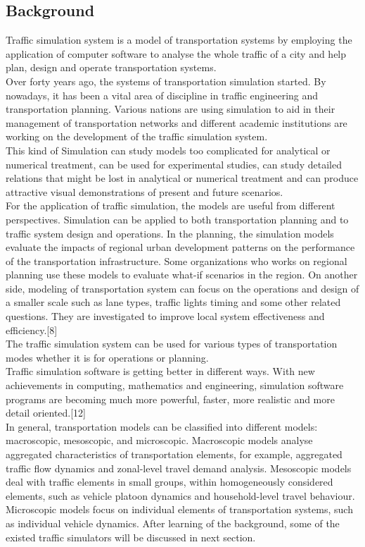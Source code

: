 \documentclass[a4paper,12pt]{article}
\begin{document}
\subsection{Background}
Traffic simulation system is a model of transportation systems by employing the application of computer software to analyse the whole traffic of a city and help plan, design and operate transportation systems.\\
Over forty years ago, the systems of transportation simulation started. By nowadays, it has been a vital area of discipline in traffic engineering and transportation planning. Various nations are using simulation to aid in their management of transportation networks and different academic institutions are working on the development of the traffic simulation system.\\
This kind of Simulation can study models too complicated for analytical or numerical treatment, can be used for experimental studies, can study detailed relations that might be lost in analytical or numerical treatment and can produce attractive visual demonstrations of present and future scenarios.\\
For the application of traffic simulation, the models are useful from different perspectives. Simulation can be applied to both transportation planning and to traffic system design and operations. In the planning, the simulation models evaluate the impacts of regional urban development patterns on the performance of the transportation infrastructure. Some organizations who works on regional planning use these models to evaluate what-if scenarios in the region. On another side, modeling of transportation system can focus on the operations and design of a smaller scale such as lane types, traffic lights timing and some other related questions. They are investigated to improve local system effectiveness and efficiency.[8]\\
The traffic simulation system can be used for various types of transportation modes whether it is for operations or planning.\\
Traffic simulation software is getting better in different ways. With new achievements in computing, mathematics and engineering, simulation software programs are becoming much more powerful, faster, more realistic and more detail oriented.[12]\\
In general, transportation models can be classified into different models: macroscopic, mesoscopic, and microscopic. Macroscopic models analyse aggregated characteristics of transportation elements, for example, aggregated traffic flow dynamics and zonal-level travel demand analysis. Mesoscopic models deal with traffic elements in small groups, within homogeneously considered elements, such as vehicle platoon dynamics and household-level travel behaviour. Microscopic models focus on individual elements of transportation systems, such as individual vehicle dynamics.
After learning of the background, some of the existed traffic simulators will be discussed in next section.\\
\end{document}
